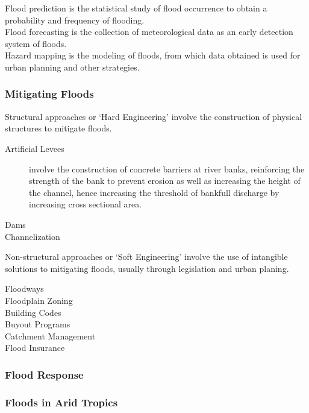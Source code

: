 \documentclass[../../main]{subfiles}
\begin{document}
	Flood prediction is the statistical study of flood occurrence to obtain a probability and frequency of flooding. \\

	Flood forecasting is the collection of meteorological data as an early detection system of floods. \\

	Hazard mapping is the modeling of floods, from which data obtained is used for urban planning and other strategies.

\subsubsection{Mitigating Floods}

	Structural approaches or `Hard Engineering' involve the construction of physical structures to mitigate floods.

	\begin{description}
		\item[Artificial Levees] involve the construction of concrete barriers at river banks, reinforcing the strength of the bank to prevent erosion as well as increasing the height of the channel, hence increasing the threshold of bankfull discharge by increasing cross sectional area. \\
		\item[Dams]
		\item[Channelization]
	\end{description}

	Non-structural approaches or `Soft Engineering' involve the use of intangible solutions to mitigating floods, usually through legislation and urban planing.

	\begin{description}
		\item[Floodways]
		\item[Floodplain Zoning]
		\item[Building Codes]
		\item[Buyout Programs]
		\item[Catchment Management]
		\item[Flood Insurance]
	\end{description}

\subsubsection{Flood Response}

\subsubsection{Floods in Arid Tropics}
\end{document}
